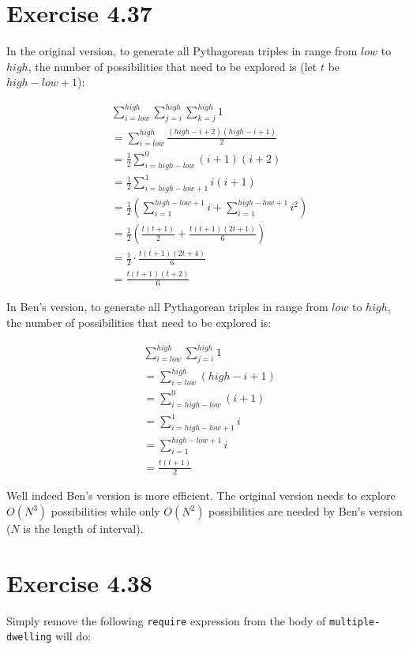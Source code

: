 \documentclass[../main.tex]{subfiles}
\begin{document}
\section{Exercise 4.37}

In the original version, to generate all Pythagorean triples in range from $low$ to $high$, the number of possibilities that need to be explored is (let $t$ be $high-low+1$):

\begin{align*}
& \sum_{i=low}^{high} \sum_{j=i}^{high} \sum_{k=j}^{high} 1 \\
&= \sum_{i=low}^{high} \frac{(high-i+2)(high-i+1)}{2} \\
&= \frac{1}{2} \sum_{i=high-low}^{0} (i+1)(i+2) \\
&= \frac{1}{2} \sum_{i=high-low+1}^{1} i(i+1) \\
&= \frac{1}{2} \left( \sum_{i=1}^{high-low+1}i + \sum_{i=1}^{high-low+1}i^2 \right) \\
&= \frac{1}{2} \left( \frac{t(t+1)}{2} + \frac{t(t+1)(2t+1)}{6}\right) \\
&= \frac{1}{2} \cdot \frac{t(t+1)(2t+4)}{6} \\
&= \frac{t(t+1)(t+2)}{6}
\end{align*}

In Ben's version, to generate all Pythagorean triples in range from $low$ to $high$, the number of possibilities that need to be explored is:

\begin{align*}
& \sum_{i=low}^{high} \sum_{j=i}^{high} 1 \\
&= \sum_{i=low}^{high} (high - i + 1) \\
&= \sum_{i=high-low}^{0} (i + 1) \\
&= \sum_{i=high-low+1}^{1} i \\
&= \sum_{i=1}^{high-low+1} i \\
&= \frac{t(t+1)}{2}
\end{align*}

Well indeed Ben's version is more efficient. The original version needs to explore $O(N^3)$ possibilities while only $O(N^2)$ possibilities are needed by Ben's version ($N$ is the length of interval).

\section{Exercise 4.38}

Simply remove the following \lstinline{require} expression from the body of \lstinline{multiple-dwelling} will do:
\end{document}
